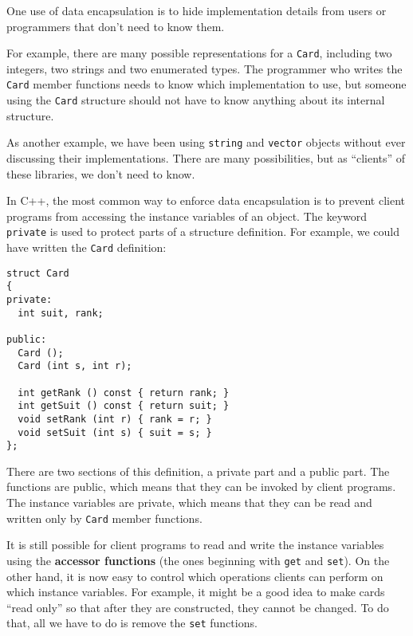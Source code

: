 
One use of data encapsulation is to hide implementation details 
from users or programmers that don't need to know them.

For example, there are many possible representations for a {\tt Card},
including two integers, two strings and two enumerated types.  The
programmer who writes the {\tt Card} member functions needs to
know which implementation to use, but
someone using
the {\tt Card} structure should not have to know anything about
its internal structure.

As another example, we have been using {\tt string} and
{\tt vector} objects without ever discussing their implementations.
There are many possibilities, but as ``clients'' of these
libraries, we don't need to know.


In C++, the most common way to enforce data encapsulation is
to prevent client programs from accessing the instance variables
of an object.  The keyword {\tt private} is used to protect parts
of a structure definition.  For example, we could have written
the {\tt Card} definition:

\begin{lstlisting}
struct Card
{
private:
  int suit, rank;

public:
  Card ();
  Card (int s, int r);

  int getRank () const { return rank; }
  int getSuit () const { return suit; }
  void setRank (int r) { rank = r; }
  void setSuit (int s) { suit = s; }
};
\end{lstlisting}
%
There are two sections of this definition, a private part and
a public part.  The functions are public, which means that they
can be invoked by client programs.  The instance variables are
private, which means that they can be read and written only by
{\tt Card} member functions.


It is still possible for client programs to read and
write the instance variables using the {\bf accessor functions}
(the ones beginning with {\tt get} and {\tt set}).
On the other hand, it is now easy to control which
operations clients can perform on which instance variables.
For example, it might be a good idea to make cards ``read only''
so that after they are constructed, they cannot be changed.
To do that, all we have to do is remove the {\tt set} functions.

